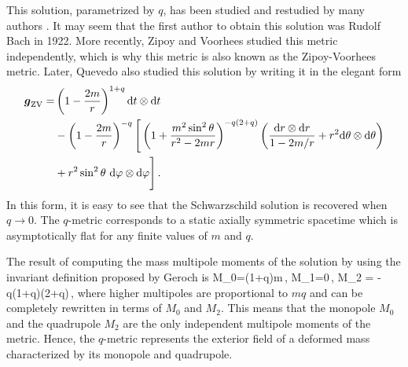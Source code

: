 \documentclass[12pt]{article}
\begin{document}
This solution, parametrized by $q$, has been studied and restudied by many authors \cite{bach1922neue, darmois1927memorial, zipoy1966topology, gautreau1967directional, bonnor1968interpretation, voorhees1970static, esposito1975static,  kodama2003global, quevedo2011mass}. It may seem that the first author to obtain this solution was Rudolf Bach \cite{bach1922neue} in 1922. More recently, Zipoy \cite{zipoy1966topology} and Voorhees \cite{voorhees1970static} studied this metric independently, which is why this metric is also known as the Zipoy-Voorhees metric. Later, Quevedo \cite{quevedo2011mass} also studied this solution by writing it in the elegant form
\begin{align}
	\boldsymbol{g}_{\rm ZV} =& \left(1-\frac{2m}{r}\right)^{1+q}{\rm d}t \otimes {\rm d} t\notag \\
	&-\left(1-\frac{2m}{r}\right)^{-q}\Bigg[ \left(1+\frac{m^2 \sin^2\theta}{r^2-2mr}\right)^{-q(2+q)}\left(\frac{{\rm d}r \otimes {\rm d} r}{1-2m/r}+r^2{\rm d}\theta \otimes {\rm d} \theta\right) \notag \\
	&+r^2\sin^2\theta\,\, {\rm d}\varphi \otimes {\rm d} \varphi\Bigg]\,.
\end{align}
In this form, it is easy to see that the Schwarzschild solution is recovered when $q\to 0$. The $q$-metric corresponds to a static axially symmetric spacetime which is asymptotically flat for any finite values of $m$ and $q$. 

The result of computing the mass multipole moments of the solution by using the invariant definition proposed by Geroch \cite{geroch1970a, geroch1970b} is 
\be 
	M_0=(1+q)m\,, \quad M_1=0\,, \quad M_2 = -q(1+q)(2+q)\,,
\ee
where higher multipoles are proportional to $mq$ and can be completely rewritten in terms of $M_0$ and $M_2$. This means that the monopole $M_0$ and the quadrupole $M_2$ are the only independent multipole moments of the metric. Hence, the $q$-metric represents the exterior field of a deformed mass characterized by its monopole and quadrupole.
\end{document}
